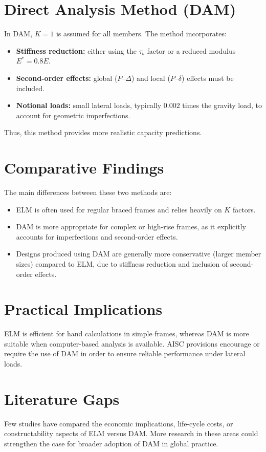 \documentclass[12pt,a4paper]{article}
\begin{document}
\section{Direct Analysis Method (DAM)}
In DAM, $K=1$ is assumed for all members. The method incorporates:
\begin{itemize}
    \item \textbf{Stiffness reduction:} either using the $\tau_b$ factor or a reduced modulus $E^\ast = 0.8E$.  
    \item \textbf{Second-order effects:} global ($P$--$\Delta$) and local ($P$--$\delta$) effects must be included.  
    \item \textbf{Notional loads:} small lateral loads, typically $0.002$ times the gravity load, to account for geometric imperfections.  
\end{itemize}
Thus, this method provides more realistic capacity predictions.

\section{Comparative Findings}
The main differences between these two methods are:
\begin{itemize}
    \item ELM is often used for regular braced frames and relies heavily on $K$ factors.  
    \item DAM is more appropriate for complex or high-rise frames, as it explicitly accounts for imperfections and second-order effects.  
    \item Designs produced using DAM are generally more conservative (larger member sizes) compared to ELM, due to stiffness reduction and inclusion of second-order effects.  
\end{itemize}

\section{Practical Implications}
ELM is efficient for hand calculations in simple frames, whereas DAM is more suitable when computer-based analysis is available. AISC provisions encourage or require the use of DAM in order to ensure reliable performance under lateral loads.

\section{Literature Gaps}
Few studies have compared the economic implications, life-cycle costs, or constructability aspects of ELM versus DAM. More research in these areas could strengthen the case for broader adoption of DAM in global practice.
\end{document}
